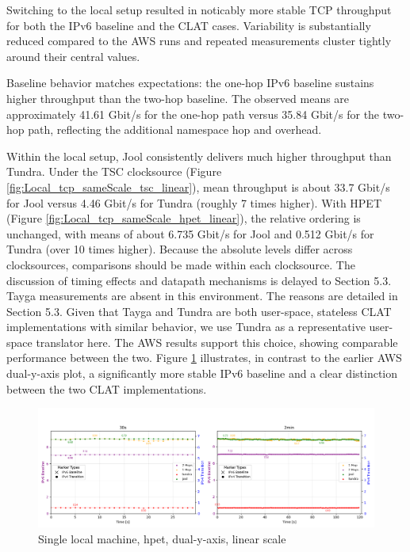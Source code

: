Switching to the local setup resulted in noticably more stable TCP throughput for both the IPv6 baseline and the CLAT cases. Variability is substantially reduced compared to the AWS runs and repeated measurements cluster tightly around their central values.

Baseline behavior matches expectations: the one-hop IPv6 baseline sustains higher throughput than the two-hop baseline. The observed means are approximately 41.61 Gbit/s for the one-hop path versus 35.84 Gbit/s for the two-hop path, reflecting the additional namespace hop and overhead.

Within the local setup, Jool consistently delivers much higher throughput than Tundra. Under the TSC clocksource (Figure \ref{fig:Local_tcp_sameScale_tsc_linear}), mean throughput is about 33.7 Gbit/s for Jool versus 4.46 Gbit/s for Tundra (roughly 7 times higher). With HPET (Figure \ref{fig:Local_tcp_sameScale_hpet_linear}), the relative ordering is unchanged, with means of about 6.735 Gbit/s for Jool and 0.512 Gbit/s for Tundra (over 10 times higher). Because the absolute levels differ across clocksources, comparisons should be made within each clocksource. The discussion of timing effects and datapath mechanisms is delayed to Section 5.3.
Tayga measurements are absent in this environment. The reasons are detailed in Section 5.3. Given that Tayga and Tundra are both user-space, stateless CLAT implementations with similar behavior, we use Tundra as a representative user-space translator here. The AWS results support this choice, showing comparable performance between the two.
Figure \ref{fig:Local_tcp_dualAxis_hpet_linear} illustrates, in contrast to the earlier AWS dual-y-axis plot, a significantly more stable IPv6 baseline and a clear distinction between the two CLAT implementations. 

\begin{figure}[H]
    \centering
    \includegraphics[width=1\textwidth]{resources/plots/JitterPlot/Single_tcp_dualAxis_hpet_linear.png}
    \caption{Single local machine, hpet, dual-y-axis, linear scale}
    \label{fig:Local_tcp_dualAxis_hpet_linear}
\end{figure}

